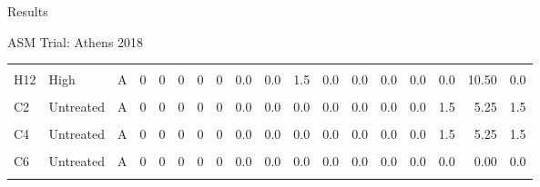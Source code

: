 \documentclass[
  ignorenonframetext,
]{beamer}
\begin{document}
\begin{frame}{Results}
\begin{block}{ASM Trial: Athens 2018}
\begin{table}
{\begin{tabular}[t]{lllrrrrrrrrrrrrrrr}
\cellcolor{gray!6}{H11} & \cellcolor{gray!6}{High} & \cellcolor{gray!6}{A} & \cellcolor{gray!6}{0} & \cellcolor{gray!6}{0} & \cellcolor{gray!6}{0} & \cellcolor{gray!6}{0} & \cellcolor{gray!6}{0} & \cellcolor{gray!6}{0.0} & \cellcolor{gray!6}{0.0} & \cellcolor{gray!6}{0.0} & \cellcolor{gray!6}{0.0} & \cellcolor{gray!6}{0.0} & \cellcolor{gray!6}{0.0} & \cellcolor{gray!6}{0.0} & \cellcolor{gray!6}{1.5} & \cellcolor{gray!6}{5.25} & \cellcolor{gray!6}{1.5}\\
\addlinespace
H12 & High & A & 0 & 0 & 0 & 0 & 0 & 0.0 & 0.0 & 1.5 & 0.0 & 0.0 & 0.0 & 0.0 & 0.0 & 10.50 & 0.0\\
\cellcolor{gray!6}{C1} & \cellcolor{gray!6}{Untreated} & \cellcolor{gray!6}{A} & \cellcolor{gray!6}{0} & \cellcolor{gray!6}{0} & \cellcolor{gray!6}{0} & \cellcolor{gray!6}{0} & \cellcolor{gray!6}{0} & \cellcolor{gray!6}{0.0} & \cellcolor{gray!6}{0.0} & \cellcolor{gray!6}{0.0} & \cellcolor{gray!6}{0.0} & \cellcolor{gray!6}{0.0} & \cellcolor{gray!6}{0.0} & \cellcolor{gray!6}{0.0} & \cellcolor{gray!6}{0.0} & \cellcolor{gray!6}{0.00} & \cellcolor{gray!6}{0.0}\\
C2 & Untreated & A & 0 & 0 & 0 & 0 & 0 & 0.0 & 0.0 & 0.0 & 0.0 & 0.0 & 0.0 & 0.0 & 1.5 & 5.25 & 1.5\\
\cellcolor{gray!6}{C3} & \cellcolor{gray!6}{Untreated} & \cellcolor{gray!6}{A} & \cellcolor{gray!6}{0} & \cellcolor{gray!6}{0} & \cellcolor{gray!6}{0} & \cellcolor{gray!6}{0} & \cellcolor{gray!6}{0} & \cellcolor{gray!6}{0.0} & \cellcolor{gray!6}{0.0} & \cellcolor{gray!6}{0.0} & \cellcolor{gray!6}{0.0} & \cellcolor{gray!6}{0.0} & \cellcolor{gray!6}{0.0} & \cellcolor{gray!6}{0.0} & \cellcolor{gray!6}{0.0} & \cellcolor{gray!6}{0.00} & \cellcolor{gray!6}{0.0}\\
C4 & Untreated & A & 0 & 0 & 0 & 0 & 0 & 0.0 & 0.0 & 0.0 & 0.0 & 0.0 & 0.0 & 0.0 & 1.5 & 5.25 & 1.5\\
\addlinespace
\cellcolor{gray!6}{C5} & \cellcolor{gray!6}{Untreated} & \cellcolor{gray!6}{A} & \cellcolor{gray!6}{0} & \cellcolor{gray!6}{0} & \cellcolor{gray!6}{0} & \cellcolor{gray!6}{0} & \cellcolor{gray!6}{0} & \cellcolor{gray!6}{0.0} & \cellcolor{gray!6}{0.0} & \cellcolor{gray!6}{0.0} & \cellcolor{gray!6}{0.0} & \cellcolor{gray!6}{0.0} & \cellcolor{gray!6}{0.0} & \cellcolor{gray!6}{0.0} & \cellcolor{gray!6}{0.0} & \cellcolor{gray!6}{0.00} & \cellcolor{gray!6}{0.0}\\
C6 & Untreated & A & 0 & 0 & 0 & 0 & 0 & 0.0 & 0.0 & 0.0 & 0.0 & 0.0 & 0.0 & 0.0 & 0.0 & 0.00 & 0.0\\
\cellcolor{gray!6}{C7} & \cellcolor{gray!6}{Untreated} & \cellcolor{gray!6}{A} & \cellcolor{gray!6}{0} & \cellcolor{gray!6}{0} & \cellcolor{gray!6}{0} & \cellcolor{gray!6}{0} & \cellcolor{gray!6}{0} & \cellcolor{gray!6}{0.0} & \cellcolor{gray!6}{0.0} & \cellcolor{gray!6}{0.0} & \cellcolor{gray!6}{0.0} & \cellcolor{gray!6}{0.0} & \cellcolor{gray!6}{0.0} & \cellcolor{gray!6}{0.0} & \cellcolor{gray!6}{0.0} & \cellcolor{gray!6}{0.00} & \cellcolor{gray!6}{0.0}\\

\end{tabular}}
\end{table}
\end{block}
\end{frame}
\end{document}
